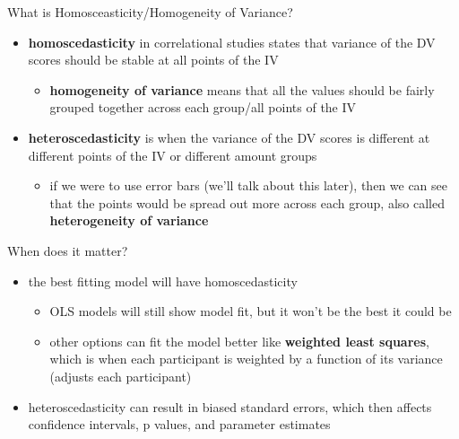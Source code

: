 \documentclass[
  ignorenonframetext,
]{beamer}
\providecommand{\tightlist}{%
  \setlength{\itemsep}{0pt}\setlength{\parskip}{0pt}}
\begin{document}
\begin{frame}{What is Homosceasticity/Homogeneity of Variance?}
\protect\hypertarget{what-is-homosceasticityhomogeneity-of-variance}{}
\begin{itemize}
\item
  \textbf{homoscedasticity} in correlational studies states that
  variance of the DV scores should be stable at all points of the IV

  \begin{itemize}
  \tightlist
  \item
    \textbf{homogeneity of variance} means that all the values should be
    fairly grouped together across each group/all points of the IV
  \end{itemize}
\item
  \textbf{heteroscedasticity} is when the variance of the DV scores is
  different at different points of the IV or different amount groups

  \begin{itemize}
  \tightlist
  \item
    if we were to use error bars (we'll talk about this later), then we
    can see that the points would be spread out more across each group,
    also called \textbf{heterogeneity of variance}
  \end{itemize}
\end{itemize}
\end{frame}

\begin{frame}{When does it matter?}
\protect\hypertarget{when-does-it-matter}{}
\begin{itemize}
\item
  the best fitting model will have homoscedasticity

  \begin{itemize}
  \item
    OLS models will still show model fit, but it won't be the best it
    could be
  \item
    other options can fit the model better like \textbf{weighted least
    squares}, which is when each participant is weighted by a function
    of its variance (adjusts each participant)
  \end{itemize}
\item
  heteroscedasticity can result in biased standard errors, which then
  affects confidence intervals, p values, and parameter estimates
\end{itemize}
\end{frame}
\end{document}
